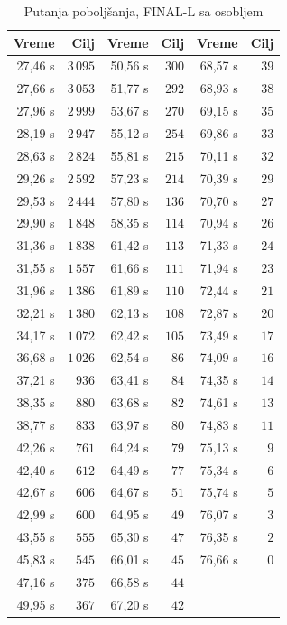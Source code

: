 \documentclass[12pt,oneside]{memoir}
\begin{document}
\begin{table}[ht]
\centering
\caption{Putanja poboljšanja, FINAL-L sa osobljem}
\label{tbl:final_traj_l}
\begin{tabular}{rr@{\hskip 2em}rr@{\hskip 2em}rr}
\toprule
\textbf{Vreme} & \textbf{Cilj} & \textbf{Vreme} & \textbf{Cilj}
& \textbf{Vreme} & \textbf{Cilj} \\
\midrule
27,46 s & $3\,095$ & 50,56 s & $300$ & 68,57 s & $39$ \\
27,66 s & $3\,053$ & 51,77 s & $292$ & 68,93 s & $38$ \\
27,96 s & $2\,999$ & 53,67 s & $270$ & 69,15 s & $35$ \\
28,19 s & $2\,947$ & 55,12 s & $254$ & 69,86 s & $33$ \\
28,63 s & $2\,824$ & 55,81 s & $215$ & 70,11 s & $32$ \\
29,26 s & $2\,592$ & 57,23 s & $214$ & 70,39 s & $29$ \\
29,53 s & $2\,444$ & 57,80 s & $136$ & 70,70 s & $27$ \\
29,90 s & $1\,848$ & 58,35 s & $114$ & 70,94 s & $26$ \\
31,36 s & $1\,838$ & 61,42 s & $113$ & 71,33 s & $24$ \\
31,55 s & $1\,557$ & 61,66 s & $111$ & 71,94 s & $23$ \\
31,96 s & $1\,386$ & 61,89 s & $110$ & 72,44 s & $21$ \\
32,21 s & $1\,380$ & 62,13 s & $108$ & 72,87 s & $20$ \\
34,17 s & $1\,072$ & 62,42 s & $105$ & 73,49 s & $17$ \\
36,68 s & $1\,026$ & 62,54 s & $86$  & 74,09 s & $16$ \\
37,21 s & $936$    & 63,41 s & $84$  & 74,35 s & $14$ \\
38,35 s & $880$    & 63,68 s & $82$  & 74,61 s & $13$ \\
38,77 s & $833$    & 63,97 s & $80$  & 74,83 s & $11$ \\
42,26 s & $761$    & 64,24 s & $79$  & 75,13 s & $9$ \\
42,40 s & $612$    & 64,49 s & $77$  & 75,34 s & $6$ \\
42,67 s & $606$    & 64,67 s & $51$  & 75,74 s & $5$ \\
42,99 s & $600$    & 64,95 s & $49$  & 76,07 s & $3$ \\
43,55 s & $555$    & 65,30 s & $47$  & 76,35 s & $2$ \\
45,83 s & $545$    & 66,01 s & $45$  & 76,66 s & $0$ \\
47,16 s & $375$    & 66,58 s & $44$  &         &     \\
49,95 s & $367$    & 67,20 s & $42$  &         &     \\
\bottomrule
\end{tabular}
\end{table}
\end{document}
